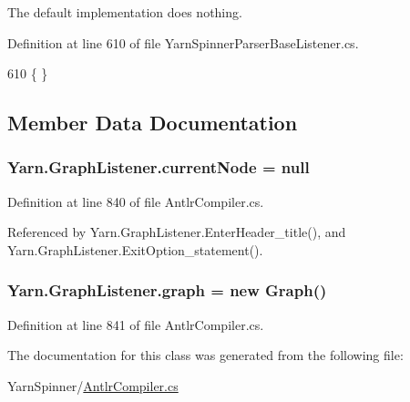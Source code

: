 The default implementation does nothing.

Definition at line 610 of file Yarn\-Spinner\-Parser\-Base\-Listener.\-cs.


\begin{DoxyCode}
610 \{ \}
\end{DoxyCode}


\subsection{Member Data Documentation}
\hypertarget{a00109_a1cf5faff80d9ae70d5fef264eb52b0e8}{
\subsubsection[{current\-Node}]{ Yarn.\-Graph\-Listener.\-current\-Node = null\hspace{0.3cm}{\ttfamily [private]}}}\label{a00109_a1cf5faff80d9ae70d5fef264eb52b0e8}


Definition at line 840 of file Antlr\-Compiler.\-cs.



Referenced by Yarn.\-Graph\-Listener.\-Enter\-Header\-\_\-title(), and Yarn.\-Graph\-Listener.\-Exit\-Option\-\_\-statement().

\hypertarget{a00109_add71b64dfe7fb107487ec6d15588ff1f}{
\subsubsection[{graph}]{ Yarn.\-Graph\-Listener.\-graph = new {\bf Graph}()}}\label{a00109_add71b64dfe7fb107487ec6d15588ff1f}


Definition at line 841 of file Antlr\-Compiler.\-cs.



The documentation for this class was generated from the following file\-:\begin{DoxyCompactItemize}
\item 
Yarn\-Spinner/\hyperlink{a00303}{Antlr\-Compiler.\-cs}\end{DoxyCompactItemize}

